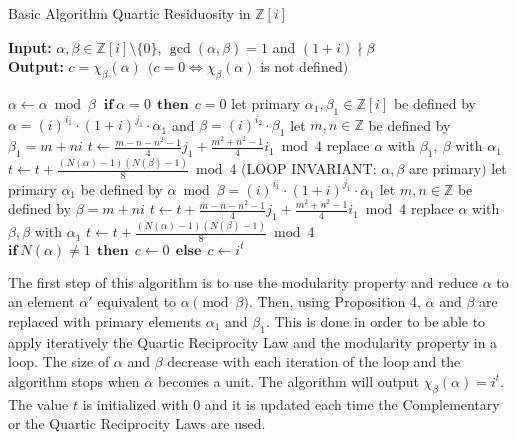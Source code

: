 \documentclass[11pt, a4paper, twoside, openright]{report}
\begin{document}
 			\begin{algorithm}[ht] 
 			 \caption{Basic Algorithm Quartic Residuosity in $\mathbb{Z}[{i}]$} 
 			 \label{alg1} 
 			 \begin{algorithmic} 
 			 \STATE
 			 \textbf{Input:} $\alpha,\beta \in \mathbb{Z}[{i}] \setminus \{0\}$, $\gcd(\alpha,\beta)=1$ 
 			 and $(1 + i) \nmid \beta$\\ 
 			 \textbf{Output:} $c = \chi_{\beta}(\alpha)~~(c=0 \Leftrightarrow \chi_{\beta}(\alpha)$ is not defined$)$  \\
 			 
 			 \bigskip
 			 
 			 \STATE $\alpha \gets \alpha \bmod \beta~$ 
 			 \STATE $\mathbf{if} ~\alpha = 0 \mathbf{~~then~}~c=0$ 
 			 \STATE let primary $\alpha_1, \beta_1 \in \mathbb{Z}[{i}]$ be defined by\newline 
 			     $\alpha = (i)^{i_1} \cdot (1 + i)^{j_1}\cdot \alpha_1$ and\newline 
 			     $ \beta = (i)^{i_2} \cdot \beta_1$ 
 			 \STATE let $m, n \in \mathbb{Z}$ be defined by $\beta_1 = m + ni$ 
 			 \STATE $t\gets {\frac{m-n-n^{2}-1}{4}} {j_1}  +  {\frac{m^{2}+ n^{2} - 1}{4}}{i_1} \bmod 4$ 
 			 \STATE replace $\alpha$ with $\beta_1, ~\beta$ with $\alpha_1$ 
 			 \STATE $t \gets t +  \frac{(N(\alpha)-1)(N(\beta)-1)}{8}\bmod 4$ 
 			 \STATE $($LOOP INVARIANT: $\alpha, \beta$ are primary$)$ 
 			 \STATE let primary $\alpha_1$ be defined by $\alpha \bmod \beta = (i)^{i_1}\cdot (1 + i)^{j_1}\cdot \alpha_1$ 
 			 \STATE let $m, n \in \mathbb{Z}$ be defined by $\beta = m + ni$ 
 			 \STATE $t\gets t + {\frac{m-n-n^{2}-1}{4}} {j_1}  +  {\frac{m^{2}+ n^{2} - 1}{4}}{i_1} \bmod 4$ 
 			 \STATE replace $\alpha$ with $\beta, \beta$ with $\alpha_1$ 
 			 \STATE $t \gets t +  \frac{(N(\alpha)-1)(N(\beta)-1)}{8}\bmod 4$ 
 			 \ENDWHILE 
 			 \STATE $\mathbf{if} { ~N(\alpha) \ne 1 }  \mathbf{~~then~}~c \gets 0~\mathbf{~else~~} c \gets i^t $ 
 			 
 			 \end{algorithmic} 
 			 \end{algorithm} 
 			
 			
 			
 		   The first step of this algorithm is to use the modularity property and reduce $\alpha$ to 
 		an element $\alpha'$ equivalent to $\alpha \pmod{\beta}$. 
 		Then, using Proposition 4, $\alpha$ and $\beta$ are replaced with primary elements 
 		$\alpha_1$ and $\beta_1$. This is done in order to be able to apply iteratively the Quartic Reciprocity Law
 		and the modularity property in a loop. The size of $\alpha$ and $\beta$ decrease with each iteration of the 
 		loop and the algorithm stops when $\alpha$ becomes a unit. 	The algorithm will output $\chi_{\beta}(\alpha)= i^t$. The value $t$ is initialized with 0 and it is updated 	each time the Complementary or the Quartic Reciprocity Laws are used.  
 		
\end{document}
